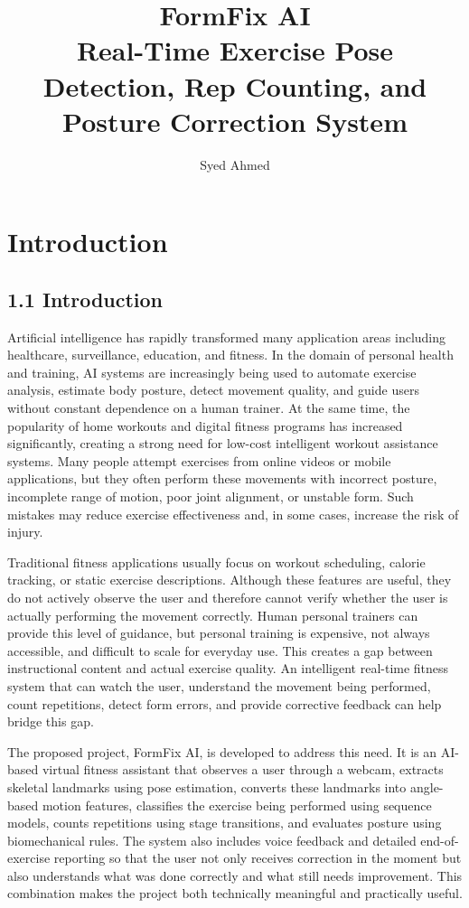 \documentclass[12pt,a4paper]{report}
\begin{document}
\setcounter{secnumdepth}{0}

\title{FormFix AI\\Real-Time Exercise Pose Detection, Rep Counting, and Posture Correction System}
\author{Syed Ahmed}
\date{}
\maketitle

\tableofcontents

\chapter{Introduction}
\section{1.1 Introduction}
Artificial intelligence has rapidly transformed many application areas including healthcare, surveillance, education, and fitness. In the domain of personal health and training, AI systems are increasingly being used to automate exercise analysis, estimate body posture, detect movement quality, and guide users without constant dependence on a human trainer. At the same time, the popularity of home workouts and digital fitness programs has increased significantly, creating a strong need for low-cost intelligent workout assistance systems. Many people attempt exercises from online videos or mobile applications, but they often perform these movements with incorrect posture, incomplete range of motion, poor joint alignment, or unstable form. Such mistakes may reduce exercise effectiveness and, in some cases, increase the risk of injury.

Traditional fitness applications usually focus on workout scheduling, calorie tracking, or static exercise descriptions. Although these features are useful, they do not actively observe the user and therefore cannot verify whether the user is actually performing the movement correctly. Human personal trainers can provide this level of guidance, but personal training is expensive, not always accessible, and difficult to scale for everyday use. This creates a gap between instructional content and actual exercise quality. An intelligent real-time fitness system that can watch the user, understand the movement being performed, count repetitions, detect form errors, and provide corrective feedback can help bridge this gap.

The proposed project, FormFix AI, is developed to address this need. It is an AI-based virtual fitness assistant that observes a user through a webcam, extracts skeletal landmarks using pose estimation, converts these landmarks into angle-based motion features, classifies the exercise being performed using sequence models, counts repetitions using stage transitions, and evaluates posture using biomechanical rules. The system also includes voice feedback and detailed end-of-exercise reporting so that the user not only receives correction in the moment but also understands what was done correctly and what still needs improvement. This combination makes the project both technically meaningful and practically useful.
\end{document}
